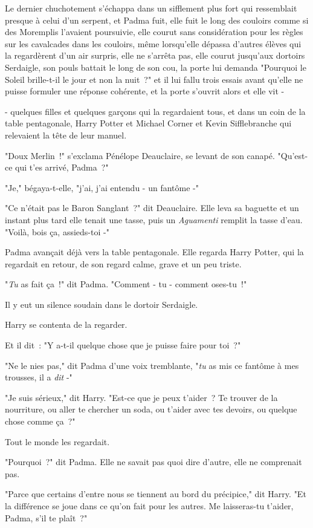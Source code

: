 Le dernier chuchotement s'échappa dans un sifflement plus fort qui ressemblait presque à celui d'un serpent, et Padma fuit, elle fuit le long des couloirs comme si des Moremplis l'avaient poursuivie, elle courut sans considération pour les règles sur les cavalcades dans les couloirs, même lorsqu'elle dépassa d'autres élèves qui la regardèrent d'un air surpris, elle ne s'arrêta pas, elle courut jusqu'aux dortoirs Serdaigle, son pouls battait le long de son cou, la porte lui demanda "Pourquoi le Soleil brille-t-il le jour et non la nuit~?" et il lui fallu trois essais avant qu'elle ne puisse formuler une réponse cohérente, et la porte s'ouvrit alors et elle vit -

- quelques filles et quelques garçons qui la regardaient tous, et dans un coin de la table pentagonale, Harry Potter et Michael Corner et Kevin Sifflebranche qui relevaient la tête de leur manuel.

"Doux Merlin~!" s'exclama Pénélope Deauclaire, se levant de son canapé. "Qu'est-ce qui t'es arrivé, Padma~?"

"Je," bégaya-t-elle, "j'ai, j'ai entendu - un fantôme -"

"Ce n'était pas le Baron Sanglant~?" dit Deauclaire. Elle leva sa baguette et un instant plus tard elle tenait une tasse, puis un \emph{Aguamenti} remplit la tasse d'eau. "Voilà, bois ça, assieds-toi -"

Padma avançait déjà vers la table pentagonale. Elle regarda Harry Potter, qui la regardait en retour, de son regard calme, grave et un peu triste.

"\emph{Tu} as fait ça~!" dit Padma. "Comment - tu - comment oses-tu~!"

Il y eut un silence soudain dans le dortoir Serdaigle.

Harry se contenta de la regarder.

Et il dit~: "Y a-t-il quelque chose que je puisse faire pour toi~?"

"Ne le nies pas," dit Padma d'une voix tremblante, "\emph{tu} as mis ce fantôme à mes trousses, il a \emph{dit} -"

"Je suis sérieux," dit Harry. "Est-ce que je peux t'aider~? Te trouver de la nourriture, ou aller te chercher un soda, ou t'aider avec tes devoirs, ou quelque chose comme ça~?"

Tout le monde les regardait.

"Pourquoi~?" dit Padma. Elle ne savait pas quoi dire d'autre, elle ne comprenait pas.

"Parce que certains d'entre nous se tiennent au bord du précipice," dit Harry. "Et la différence se joue dans ce qu'on fait pour les autres. Me laisseras-tu t'aider, Padma, s'il te plaît~?"


